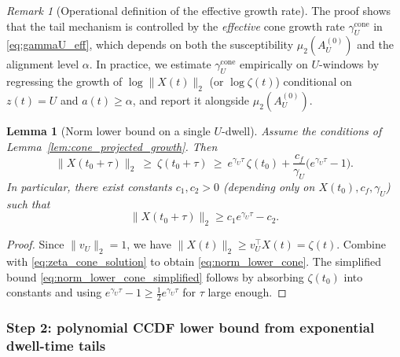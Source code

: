 \documentclass[12pt,a4paper]{article}
\newtheorem{lemma}{Lemma}
\theoremstyle{definition}
\theoremstyle{remark}
\newtheorem{remark}{Remark}
\begin{document}
\begin{remark}[Operational definition of the effective growth rate]\label{rem:effective_gammaU}
	The proof shows that the tail mechanism is controlled by the \emph{effective} cone growth rate
	$\gamma_U^{\mathrm{cone}}$ in \eqref{eq:gammaU_eff}, which depends on both the susceptibility
	$\mu_2(A_U^{(0)})$ and the alignment level $\alpha$.
	In practice, we estimate $\gamma_U^{\mathrm{cone}}$ empirically on $U$-windows by regressing the growth of $\log\|X(t)\|_2$
	(or $\log\zeta(t)$) conditional on $z(t)=U$ and $a(t)\ge \alpha$, and report it alongside $\mu_2(A_U^{(0)})$.
\end{remark}

\begin{lemma}[Norm lower bound on a single $U$-dwell]\label{lem:norm_lower_cone}
	Assume the conditions of Lemma~\ref{lem:cone_projected_growth}. Then
	\begin{equation}\label{eq:norm_lower_cone}
		\|X(t_0+\tau)\|_2 \ \ge\ \zeta(t_0+\tau)
		\ \ge\ e^{\gamma_U\tau}\,\zeta(t_0)+\frac{c_f}{\gamma_U}\Big(e^{\gamma_U\tau}-1\Big).
	\end{equation}
	In particular, there exist constants $c_1,c_2>0$ (depending only on $X(t_0),c_f,\gamma_U$) such that
	\begin{equation}\label{eq:norm_lower_cone_simplified}
		\|X(t_0+\tau)\|_2 \ge c_1 e^{\gamma_U\tau}-c_2.
	\end{equation}
\end{lemma}

\begin{proof}
	Since $\|v_U\|_2=1$, we have $\|X(t)\|_2\ge v_U^\top X(t)=\zeta(t)$.
	Combine with \eqref{eq:zeta_cone_solution} to obtain \eqref{eq:norm_lower_cone}.
	The simplified bound \eqref{eq:norm_lower_cone_simplified} follows by absorbing $\zeta(t_0)$ into constants and using
	$e^{\gamma_U\tau}-1\ge \tfrac12 e^{\gamma_U\tau}$ for $\tau$ large enough.
\end{proof}

\subsubsection*{Step 2: polynomial CCDF lower bound from exponential dwell-time tails}
\end{document}
